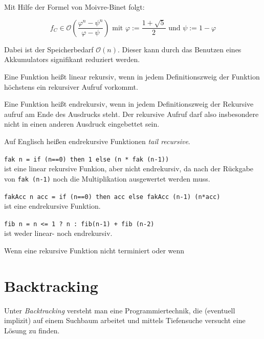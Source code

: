 Mit Hilfe der Formel von Moivre-Binet folgt:

\[f_C \in \mathcal{O} \left (\frac{\varphi^n- \psi^n}{\varphi - \psi} \right) \text{ mit } \varphi := \frac{1+ \sqrt{5}}{2} \text{ und }\psi := 1 - \varphi\]

Dabei ist der Speicherbedarf $\mathcal{O}(n)$. Dieser kann durch
das Benutzen eines Akkumulators signifikant reduziert werden.

\begin{definition}%
    Eine Funktion heißt linear rekursiv, wenn in jedem Definitionszweig
    der Funktion höchstens ein rekursiver Aufruf vorkommt.
\end{definition}

\begin{definition}%
    Eine Funktion heißt endrekursiv, wenn in jedem Definitionszweig
    der Rekursive aufruf am Ende des Ausdrucks steht. Der rekursive
    Aufruf darf also insbesondere nicht in einen anderen Ausdruck
    eingebettet sein.
\end{definition}

Auf Englisch heißen endrekursive Funktionen \textit{tail recursive}.

\begin{beispiel}
    \begin{bspenum}
        \item \texttt{fak n = if (n==0) then 1 else (n * fak (n-1))}\\
              ist eine linear rekursive Funkion, aber nicht endrekursiv,
              da nach der Rückgabe von \texttt{fak (n-1)} noch die Multiplikation
              ausgewertet werden muss.
        \item \texttt{fakAcc n acc = if (n==0) then acc else fakAcc (n-1) (n*acc)}\\
              ist eine endrekursive Funktion.
        \item \texttt{fib n = n <= 1 ? n : fib(n-1) + fib (n-2)}\\
              ist weder linear- noch endrekursiv.
    \end{bspenum}
\end{beispiel}

Wenn eine rekursive Funktion nicht terminiert oder wenn 

\section{Backtracking}
Unter \textit{Backtracking} versteht man eine Programmiertechnik, die
(eventuell implizit) auf einem Suchbaum arbeitet und mittels Tiefensuche versucht
eine Lösung zu finden.

